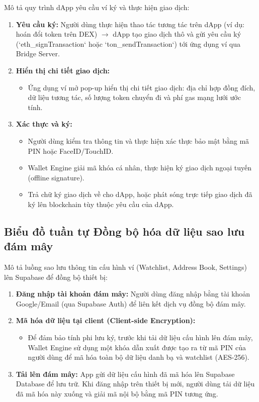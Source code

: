 \documentclass[a4paper]{report}
\begin{document}
Mô tả quy trình dApp yêu cầu ví ký và thực hiện giao dịch:
\begin{enumerate}
    \item \textbf{Yêu cầu ký:} Người dùng thực hiện thao tác tương tác trên dApp (ví dụ: hoán đổi token trên DEX) $\rightarrow$ dApp tạo giao dịch thô và gửi yêu cầu ký (`eth\_signTransaction` hoặc `ton\_sendTransaction`) tới ứng dụng ví qua Bridge Server.
    \item \textbf{Hiển thị chi tiết giao dịch:}
    \begin{itemize}
        \item Ứng dụng ví mở pop-up hiển thị chi tiết giao dịch: địa chỉ hợp đồng đích, dữ liệu tương tác, số lượng token chuyển đi và phí gas mạng lưới ước tính.
    \end{itemize}
    \item \textbf{Xác thực và ký:}
    \begin{itemize}
        \item Người dùng kiểm tra thông tin và thực hiện xác thực bảo mật bằng mã PIN hoặc FaceID/TouchID.
        \item Wallet Engine giải mã khóa cá nhân, thực hiện ký giao dịch ngoại tuyến (offline signature).
        \item Trả chữ ký giao dịch về cho dApp, hoặc phát sóng trực tiếp giao dịch đã ký lên blockchain tùy thuộc yêu cầu của dApp.
    \end{itemize}
\end{enumerate}

\subsection{Biểu đồ tuần tự Đồng bộ hóa dữ liệu sao lưu đám mây}


Mô tả luồng sao lưu thông tin cấu hình ví (Watchlist, Address Book, Settings) lên Supabase để đồng bộ thiết bị:
\begin{enumerate}
    \item \textbf{Đăng nhập tài khoản đám mây:} Người dùng đăng nhập bằng tài khoản Google/Email (qua Supabase Auth) để liên kết dịch vụ đồng bộ đám mây.
    \item \textbf{Mã hóa dữ liệu tại client (Client-side Encryption):}
    \begin{itemize}
        \item Để đảm bảo tính phi lưu ký, trước khi tải dữ liệu cấu hình lên đám mây, Wallet Engine sử dụng một khóa dẫn xuất được tạo ra từ mã PIN của người dùng để mã hóa toàn bộ dữ liệu danh bạ và watchlist (AES-256).
    \end{itemize}
    \item \textbf{Tải lên đám mây:} App gửi dữ liệu cấu hình đã mã hóa lên Supabase Database để lưu trữ. Khi đăng nhập trên thiết bị mới, người dùng tải dữ liệu đã mã hóa này xuống và giải mã nội bộ bằng mã PIN tương ứng.
\end{enumerate}
\end{document}
